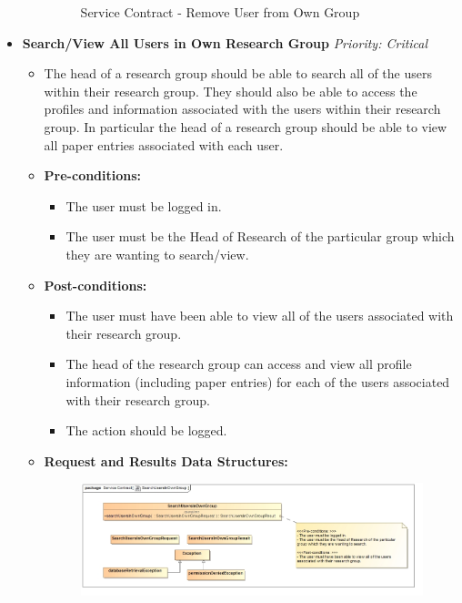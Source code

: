 \documentclass{article}
\begin{document}
\begin{itemize}
\begin{itemize}
\begin{figure}[H]
							\caption{Service Contract - Remove User from Own Group}
						\end{figure}
					\end{itemize}
					
					\cleardoublepage
					\item \textbf{Search/View All Users in Own Research Group} \hfill \textit{Priority: Critical}
					\begin{itemize}
						\item The head of a research group should be able to search all of the users within their research group. They should also be able to access the profiles and information associated with the users within their research group. In particular the head of a research group should be able to view all paper entries associated with each user.
						\item \textbf{Pre-conditions:}
						\begin{itemize}
							\item The user must be logged in.
							\item The user must be the Head of Research of the particular group which they are wanting to search/view.
						\end{itemize}
						\item \textbf{Post-conditions:}
						\begin{itemize}
							\item The user must have been able to view all of the users associated with their research group.
							\item The head of the research group can access and view all profile information (including paper entries) for each of the users associated with their research group.
							\item The action should be logged.
						\end{itemize}
						\item \textbf{Request and Results Data Structures:}
						\begin{figure}[H]
							\includegraphics[width=\linewidth]{../Diagrams/ServiceContracts/User subsystem/SearchUsersInOwnGroup.jpg}

\end{figure}
\end{itemize}
\end{itemize}
\end{document}

